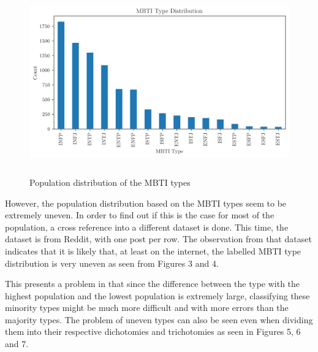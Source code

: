 \documentclass[11pt,a4paper]{article}
\begin{document}
	\begin{figure}[h!]
		\centering
		
		\includegraphics[height=8cm]{../output/visualisations/class_dist}
		
		\caption{Population distribution of the MBTI types}
		
	\end{figure}



	However, the population distribution based on the MBTI types seem to be extremely uneven. In order to find out if this is the case for most of the population, a cross reference into a different dataset is done. This time, the dataset is from Reddit, with one post per row.\autocite{storeyMyersBriggsPersonality2018} The observation from that dataset indicates that it is likely that, at least on the internet, the labelled MBTI type distribution is very uneven as seen from Figures 3 and 4.
	
	This presents a problem in that since the difference between the type with the highest population and the lowest population is extremely large, classifying these minority types might be much more difficult and with more errors than the majority types. The problem of uneven types can also be seen even when dividing them into their respective dichotomies and trichotomies as seen in Figures 5, 6 and 7.
	
\end{document}
